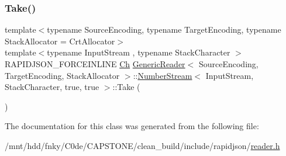 \subsubsection{\texorpdfstring{Take()}{Take()}}
{\footnotesize\ttfamily template$<$typename Source\+Encoding, typename Target\+Encoding, typename Stack\+Allocator = Crt\+Allocator$>$ \\
template$<$typename Input\+Stream , typename Stack\+Character $>$ \\
R\+A\+P\+I\+D\+J\+S\+O\+N\+\_\+\+F\+O\+R\+C\+E\+I\+N\+L\+I\+NE \hyperlink{classGenericReader_1_1NumberStream_3_01InputStream_00_01StackCharacter_00_01false_00_01false_01_4_a2971d286306cf8df899b87ea9dd24f27}{Ch} \hyperlink{classGenericReader}{Generic\+Reader}$<$ Source\+Encoding, Target\+Encoding, Stack\+Allocator $>$\+::\hyperlink{classGenericReader_1_1NumberStream}{Number\+Stream}$<$ Input\+Stream, Stack\+Character, true, true $>$\+::Take (\begin{DoxyParamCaption}{ }\end{DoxyParamCaption})\hspace{0.3cm}{\ttfamily [inline]}}



The documentation for this class was generated from the following file\+:\begin{DoxyCompactItemize}
\item 
/mnt/hdd/fnky/\+C0de/\+C\+A\+P\+S\+T\+O\+N\+E/clean\+\_\+build/include/rapidjson/\hyperlink{reader_8h}{reader.\+h}\end{DoxyCompactItemize}
